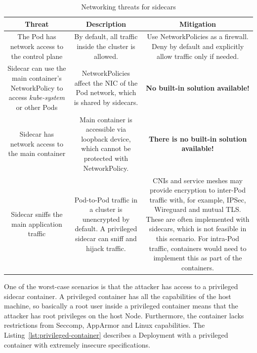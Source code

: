 \documentclass[english, 12pt, a4paper, sci, utf8, a-2b, online]{aaltothesis}
\begin{document}
\begin{table}[H]
  \sffamily
  \centering

  \caption{Networking threats for sidecars}
  \label{table:threat-model-network}

  \begin{minipage}{\textwidth}
  \renewcommand{\thempfootnote}{\arabic{mpfootnote}}
  \begin{tabularx}{\textwidth}{CCC}
    \hline
    \textbf{Threat} & \textbf{Description} & \textbf{Mitigation} \\ \hline
    The Pod has network access to the control plane & By default, all traffic inside the cluster is allowed. & Use NetworkPolicies as a firewall. Deny by default and explicitly allow traffic only if needed. \\ \hline
    Sidecar can use the main container's NetworkPolicy to access \emph{kube-system} or other Pods & NetworkPolicies affect the NIC of the Pod network, which is shared by sidecars. & \textbf{No built-in solution available!} \\ \hline
    Sidecar has network access to the main container & Main container is accessible via loopback device, which cannot be protected with NetworkPolicy. & \textbf{There is no built-in solution available!} \\ \hline
    Sidecar sniffs the main application traffic & Pod-to-Pod traffic in a cluster is unencrypted by default. A privileged sidecar can sniff and hijack traffic. & CNIs and service meshes may provide encryption to inter-Pod traffic with, for example, IPSec, Wireguard and mutual TLS. These are often implemented with sidecars, which is not feasible in this scenario. For intra-Pod traffic, containers would need to implement this as part of the containers. \\ \hline
  \end{tabularx}
\end{minipage}
\end{table}

One of the worst-case scenarios is that the attacker has access to a privileged sidecar container.
A privileged container has all the capabilities of the host machine, so basically a root user inside a privileged container means that the attacker has root privileges on the host Node.
Furthermore, the container lacks restrictions from Seccomp, AppArmor and Linux capabilities.
The Listing~\ref{lst:privileged-container} describes a Deployment with a privileged container with extremely insecure specifications.
\end{document}
